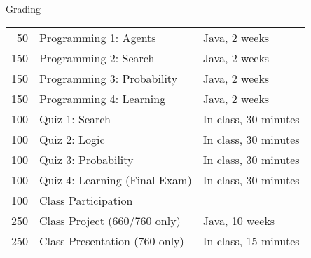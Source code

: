 \documentclass[14pt]{beamer}
\begin{document}
\begin{frame}{Grading}
\begin{tabular}{@{} r l l @{}}
\hline
 50 & Programming 1: Agents & Java, 2 weeks \\
150 & Programming 2: Search & Java, 2 weeks  \\
150 & Programming 3: Probability & Java, 2 weeks  \\
150 & Programming 4: Learning & Java, 2 weeks  \\
\hline
100 & Quiz 1: Search & In class, 30 minutes \\
100 & Quiz 2: Logic & In class, 30 minutes \\
100 & Quiz 3: Probability & In class, 30 minutes \\
100 & Quiz 4: Learning (Final Exam) & In class, 30 minutes \\
\hline
100 & Class Participation \\
\hline
250 & Class Project (\alert{660/760 only}) & Java, 10 weeks \\
250 & Class Presentation (\alert{760 only}) & In class, 15 minutes \\
\hline
\end{tabular}
\end{frame}
\end{document}
